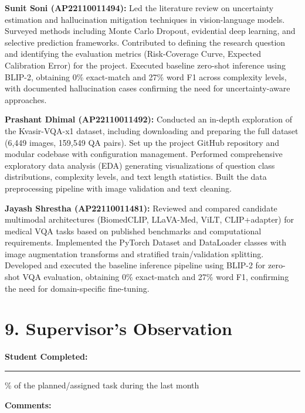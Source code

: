 \documentclass[12pt,a4paper]{article}
\begin{document}
\noindent\textbf{Sunit Soni (AP22110011494):}
Led the literature review on uncertainty estimation and hallucination mitigation techniques in vision-language models. Surveyed methods including Monte Carlo Dropout, evidential deep learning, and selective prediction frameworks. Contributed to defining the research question and identifying the evaluation metrics (Risk-Coverage Curve, Expected Calibration Error) for the project. Executed baseline zero-shot inference using BLIP-2, obtaining 0\% exact-match and 27\% word F1 across complexity levels, with documented hallucination cases confirming the need for uncertainty-aware approaches.

\vspace{0.4cm}

\noindent\textbf{Prashant Dhimal (AP22110011492):}
Conducted an in-depth exploration of the Kvasir-VQA-x1 dataset, including downloading and preparing the full dataset (6,449 images, 159,549 QA pairs). Set up the project GitHub repository and modular codebase with configuration management. Performed comprehensive exploratory data analysis (EDA) generating visualizations of question class distributions, complexity levels, and text length statistics. Built the data preprocessing pipeline with image validation and text cleaning.

\vspace{0.4cm}

\noindent\textbf{Jayash Shrestha (AP22110011481):}
Reviewed and compared candidate multimodal architectures (BiomedCLIP, LLaVA-Med, ViLT, CLIP+adapter) for medical VQA tasks based on published benchmarks and computational requirements. Implemented the PyTorch Dataset and DataLoader classes with image augmentation transforms and stratified train/validation splitting. Developed and executed the baseline inference pipeline using BLIP-2 for zero-shot VQA evaluation, obtaining 0\% exact-match and 27\% word F1, confirming the need for domain-specific fine-tuning.

\section*{9. Supervisor's Observation}

\noindent\textbf{Student Completed:} \rule{3cm}{0.4pt}\% 
of the planned/assigned task during the last month

\vspace{0.5cm}

\noindent\textbf{Comments:}
\end{document}
